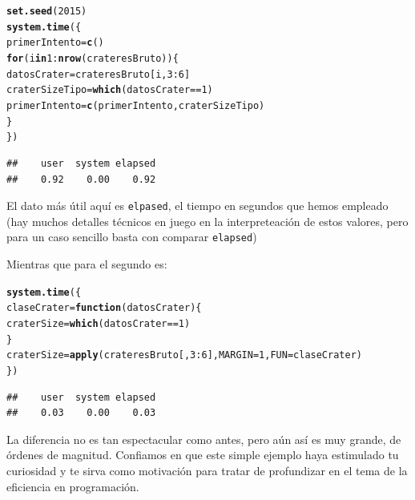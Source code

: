 \documentclass[10pt,a4paper]{article}\usepackage[]{graphicx}\usepackage[]{color}
\makeatletter
\newcommand{\hlnum}[1]{\textcolor[rgb]{0.686,0.059,0.569}{#1}}%
\newcommand{\hlopt}[1]{\textcolor[rgb]{0,0,0}{#1}}%
\newcommand{\hlstd}[1]{\textcolor[rgb]{0.345,0.345,0.345}{#1}}%
\newcommand{\hlkwa}[1]{\textcolor[rgb]{0.161,0.373,0.58}{\textbf{#1}}}%
\newcommand{\hlkwb}[1]{\textcolor[rgb]{0.69,0.353,0.396}{#1}}%
\newcommand{\hlkwc}[1]{\textcolor[rgb]{0.333,0.667,0.333}{#1}}%
\newcommand{\hlkwd}[1]{\textcolor[rgb]{0.737,0.353,0.396}{\textbf{#1}}}%
\newenvironment{kframe}{%
 \def\at@end@of@kframe{}%
 \ifinner\ifhmode%
  \def\at@end@of@kframe{\end{minipage}}%
  \begin{minipage}{\columnwidth}%
 \fi\fi%
 \def\FrameCommand##1{\hskip\@totalleftmargin \hskip-\fboxsep
 \colorbox{shadecolor}{##1}\hskip-\fboxsep
     \hskip-\linewidth \hskip-\@totalleftmargin \hskip\columnwidth}%
 \MakeFramed {\advance\hsize-\width
   \@totalleftmargin\z@ \linewidth\hsize
   \@setminipage}}%
 {\par\unskip\endMakeFramed%
 \at@end@of@kframe}
\newenvironment{knitrout}{}{} %
\makeatother
\begin{document}
\begin{knitrout}
\color{fgcolor}\begin{kframe}
\begin{alltt}
\hlkwd{set.seed}\hlstd{(}\hlnum{2015}\hlstd{)}
\hlkwd{system.time}\hlstd{(\{}
  \hlstd{primerIntento} \hlkwb{=} \hlkwd{c}\hlstd{()}
  \hlkwa{for}\hlstd{(i} \hlkwa{in} \hlnum{1}\hlopt{:}\hlkwd{nrow}\hlstd{(crateresBruto))\{}
    \hlstd{datosCrater} \hlkwb{=} \hlstd{crateresBruto[i,} \hlnum{3}\hlopt{:}\hlnum{6}\hlstd{]}
    \hlstd{craterSizeTipo} \hlkwb{=} \hlkwd{which}\hlstd{(datosCrater} \hlopt{==} \hlnum{1}\hlstd{)}
    \hlstd{primerIntento} \hlkwb{=} \hlkwd{c}\hlstd{(primerIntento, craterSizeTipo)}
  \hlstd{\}}
\hlstd{\})}
\end{alltt}
\begin{verbatim}
##    user  system elapsed 
##    0.92    0.00    0.92
\end{verbatim}
\end{kframe}
\end{knitrout}
El dato más útil aquí es {\tt elpased}, el tiempo en segundos que hemos empleado (hay muchos detalles técnicos en juego en la interpreteación de estos valores, pero para un caso sencillo basta con comparar {\tt elapsed})

Mientras que para el segundo es:
\begin{knitrout}
\color{fgcolor}\begin{kframe}
\begin{alltt}
\hlkwd{system.time}\hlstd{(\{}
  \hlstd{claseCrater} \hlkwb{=} \hlkwa{function}\hlstd{(}\hlkwc{datosCrater}\hlstd{)\{}
    \hlstd{craterSize} \hlkwb{=} \hlkwd{which}\hlstd{(datosCrater} \hlopt{==} \hlnum{1}\hlstd{)}
  \hlstd{\}}
\hlstd{craterSize} \hlkwb{=} \hlkwd{apply}\hlstd{(crateresBruto[,} \hlnum{3}\hlopt{:}\hlnum{6}\hlstd{],} \hlkwc{MARGIN} \hlstd{=} \hlnum{1}\hlstd{,} \hlkwc{FUN} \hlstd{= claseCrater)}
\hlstd{\})}
\end{alltt}
\begin{verbatim}
##    user  system elapsed 
##    0.03    0.00    0.03
\end{verbatim}
\end{kframe}
\end{knitrout}
La diferencia no es tan espectacular como antes, pero aún así es muy grande, de órdenes de magnitud. Confiamos en que este simple ejemplo haya estimulado tu curiosidad y te sirva como motivación para tratar de profundizar en el tema de la eficiencia en programación.
\end{document}
